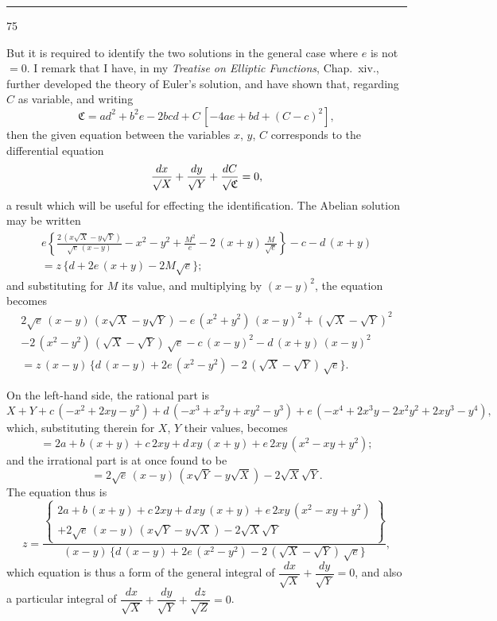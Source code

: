 \documentclass[12pt,a4paper]{article}
\begin{document}
\vspace{1ex}
\noindent\rule{2em}{0.4pt}\hfill 75

\newpage


But it is required to identify the two solutions in the general case where $e$ is not $=0$. I remark that I have, in my \textit{Treatise on Elliptic Functions}, Chap.~xiv., further developed the theory of Euler's solution, and have shown that, regarding $C$ as variable, and writing
\[
\mathfrak{C} = ad^2 + b^2e - 2bcd + C\,[-4ae + bd + (C-c)^2],
\]
then the given equation between the variables $x$, $y$, $C$ corresponds to the differential equation
\[
\frac{dx}{\surd X} + \frac{dy}{\surd Y} + \frac{dC}{\surd\mathfrak{C}} = 0,
\]
a result which will be useful for effecting the identification. The Abelian solution may be written
\begin{multline*}
e\left\{\frac{2\,(x\surd X - y\surd Y)}{\surd e\,(x-y)} - x^2 - y^2 + \frac{M^2}{e} - 2\,(x+y)\,\frac{M}{\surd e}\right\} - c - d\,(x+y) \\
= z\,\{d + 2e\,(x+y) - 2M\surd e\};
\end{multline*}
and substituting for $M$ its value, and multiplying by $(x-y)^2$, the equation becomes
\begin{multline*}
2\surd e\,(x-y)\,(x\surd X - y\surd Y) - e\,(x^2+y^2)\,(x-y)^2 + (\surd X - \surd Y)^2 \\
- 2\,(x^2-y^2)\,(\surd X - \surd Y)\,\surd e - c\,(x-y)^2 - d\,(x+y)\,(x-y)^2 \\
= z\,(x-y)\,\{d\,(x-y) + 2e\,(x^2-y^2) - 2\,(\surd X - \surd Y)\,\surd e\}.
\end{multline*}

On the left-hand side, the rational part is
\[
X + Y + c\,(-x^2 + 2xy - y^2) + d\,(-x^3 + x^2y + xy^2 - y^3) + e\,(-x^4 + 2x^3y - 2x^2y^2 + 2xy^3 - y^4),
\]
which, substituting therein for $X$, $Y$ their values, becomes
\[
= 2a + b\,(x+y) + c\,2xy + d\,xy\,(x+y) + e\,2xy\,(x^2 - xy + y^2);
\]
and the irrational part is at once found to be
\[
= 2\surd e\,(x-y)\,(x\surd Y - y\surd X) - 2\surd X\surd Y.
\]
The equation thus is
\[
z = \frac{\left\{\begin{aligned} 2a + b\,(x+y) + c\,2xy + d\,xy\,(x+y) + e\,2xy\,(x^2-xy+y^2) \\ + 2\surd e\,(x-y)\,(x\surd Y - y\surd X) - 2\surd X\surd Y \end{aligned}\right\}}{(x-y)\,\{d\,(x-y) + 2e\,(x^2-y^2) - 2\,(\surd X - \surd Y)\,\surd e\}},
\]
which equation is thus a form of the general integral of $\dfrac{dx}{\surd X} + \dfrac{dy}{\surd Y} = 0$, and also a particular integral of $\dfrac{dx}{\surd X} + \dfrac{dy}{\surd Y} + \dfrac{dz}{\surd Z} = 0$.
\end{document}
